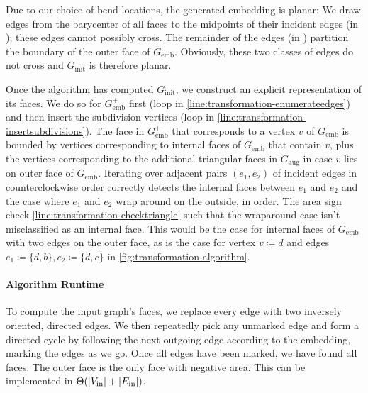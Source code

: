 Due to our choice of bend locations, the generated embedding is planar:
We draw edges from the barycenter of all faces to the midpoints of their incident edges (in ); these edges cannot possibly cross.
The remainder of the edges (in ) partition the boundary of the outer face of $G_\text{emb}$.
Obviously, these two classes of edges do not cross and $G_\text{init}$ is therefore planar.

Once the algorithm has computed $G_\text{init}$, we construct an explicit representation of its faces.
We do so for $G_\text{emb}^+$ first (loop in \cref{line:transformation-enumerateedges}) and then insert the subdivision vertices (loop in \cref{line:transformation-insertsubdivisions}).
The face in $G_\text{emb}^+$ that corresponds to a vertex $v$ of $G_\text{emb}$ is bounded by vertices corresponding to internal faces of $G_\text{emb}$ that contain $v$, plus the vertices corresponding to the additional triangular faces in $G_\text{aug}$ in case $v$ lies on outer face of $G_\text{emb}$.
Iterating over adjacent pairs $(e_1, e_2)$ of incident edges in counterclockwise order correctly detects the internal faces between $e_1$ and $e_2$ and the case where $e_1$ and $e_2$ wrap around on the outside, in order.
The area sign check \cref{line:transformation-checktriangle} such that the wraparound case isn't misclassified as an internal face.
This would be the case for internal faces of $G_\text{emb}$ with two edges on the outer face, as is the case for vertex $v \coloneqq d$ and edges $e_1 \coloneqq \{d,b\}, e_2 \coloneqq \{d,c\}$ in \cref{fig:transformation-algorithm}.



\paragraph{Algorithm Runtime}

To compute the input graph's faces, we replace every edge with two inversely oriented, directed edges.
We then repeatedly pick any unmarked edge and form a directed cycle by following the next outgoing edge according to the embedding, marking the edges as we go.
Once all edges have been marked, we have found all faces.
The outer face is the only face with negative area.
This can be implemented in $\Theta(\left\lvert V_\text{in}\right\rvert + \left\lvert E_\text{in}\right\rvert)$.

